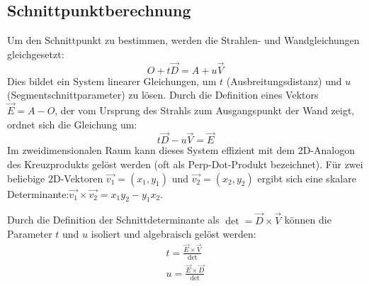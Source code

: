\documentclass{article}
\begin{document}
    \subsection{Schnittpunktberechnung}\label{subsec:intersection-formula}


    Um den Schnittpunkt zu bestimmen, werden die Strahlen- und Wandgleichungen gleichgesetzt:
    \[O + t\vec{D} = A + u\vec{V}\]
    Dies bildet ein System linearer Gleichungen, um $t$ (Ausbreitungsdistanz) und $u$ (Segmentschnittparameter) zu lösen.
    Durch die Definition eines Vektors $\vec{E} = A - O$, der vom Ursprung des Strahls zum Ausgangspunkt der Wand zeigt, ordnet sich die Gleichung um:
    \[t\vec{D} - u\vec{V} = \vec{E}\]
    Im zweidimensionalen Raum kann dieses System effizient mit dem 2D-Analogon des Kreuzprodukts gelöst werden (oft als Perp-Dot-Produkt bezeichnet).
    Für zwei beliebige 2D-Vektoren $\vec{v_1} = (x_1, y_1)$ und $\vec{v_2} = (x_2, y_2)$ ergibt sich eine skalare Determinante:$\vec{v_1} \times \vec{v_2} = x_1 y_2 - y_1 x_2$.

    Durch die Definition der Schnittdeterminante als $\det = \vec{D} \times \vec{V}$ können die Parameter $t$ und $u$ isoliert und algebraisch gelöst werden:
    \begin{gather*}
        t = \frac{\vec{E} \times \vec{V}}{\det}\\
        u = \frac{\vec{E} \times \vec{D}}{\det}\\
    \end{gather*}
\end{document}
